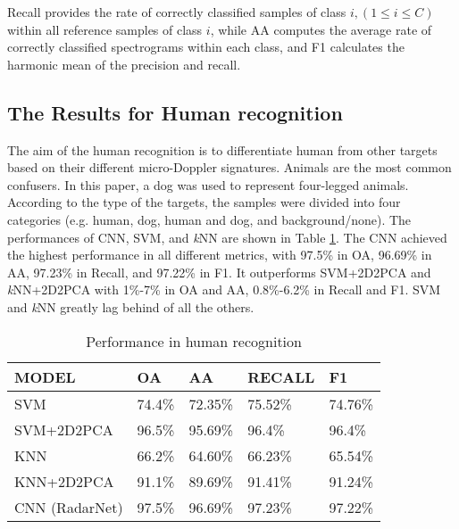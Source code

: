 Recall provides the rate of correctly classified samples of class $i, (1 \leq i\leq C)$ within all reference samples of class $i$, while AA computes the average rate of correctly classified spectrograms within each class, and F1 calculates the harmonic mean of the precision and recall.

\subsection{The Results for Human recognition}
The aim of the human recognition is to differentiate human from other targets based on their different micro-Doppler signatures. Animals are the most common confusers. In this paper, a dog was used to represent four-legged animals. According to the type of the targets, the samples were divided into four categories (e.g. human, dog, human and dog, and background/none). The performances of CNN, SVM, and \textit{k}NN are shown in Table \ref{tb-hc}. The CNN achieved the highest performance in all different metrics, with 97.5\% in OA, 96.69\% in AA, 97.23\% in Recall, and 97.22\% in F1. It outperforms SVM+2D2PCA and \textit{k}NN+2D2PCA with 1\%-7\% in OA and AA, 0.8\%-6.2\% in Recall and F1. SVM and \textit{k}NN greatly lag behind of all the others.
\begin{table}[]
\centering
\caption{Performance in human recognition}
\label{tb-hc}
\begin{tabular}{|l|l|l|l|l|}
\hline
\textbf{MODEL} & \textbf{OA} & \textbf{AA} & \textbf{RECALL} & \textbf{F1} \\ \hline
SVM            & 74.4\%      & 72.35\%     & 75.52\%         & 74.76\%     \\ \hline
SVM+2D2PCA     & 96.5\%      & 95.69\%     & 96.4\%          & 96.4\%      \\ \hline
KNN            & 66.2\%      & 64.60\%     & 66.23\%         & 65.54\%     \\ \hline
KNN+2D2PCA     & 91.1\%      & 89.69\%     & 91.41\%         & 91.24\%     \\ \hline
CNN (RadarNet) & 97.5\%      & 96.69\%     & 97.23\%         & 97.22\%     \\ \hline
\end{tabular}
\end{table}

